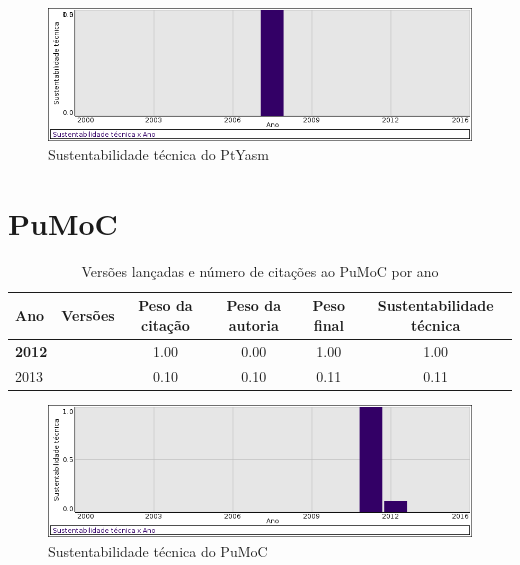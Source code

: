 \begin{figure}[h]
  \center
  \includegraphics[scale=0.50]{imagens/softwares-charts/ptyasm.png}
  \caption{Sustentabilidade técnica do PtYasm}
\end{figure}


\section{PuMoC}


\begin{table}[H]
\caption{Versões lançadas e número de citações ao PuMoC por ano}
\centering
\begin{tabular}{| l | c | c | c | c | c |}
  \hline
  Ano & Versões & Peso da citação & Peso da autoria & Peso final & Sustentabilidade técnica \\
  \hline
            {\bf 2012}
          &
          
          &
          1.00
          &
          0.00
          &
          1.00
          &
            {\color{blue} 1.00}
          \\
\hline
            2013
          &
          
          &
          0.10
          &
          0.10
          &
          0.11
          &
            {\color{red} 0.11}
          \\
\hline
\end{tabular}
\end{table}

\begin{figure}[h]
  \center
  \includegraphics[scale=0.50]{imagens/softwares-charts/pumoc.png}
  \caption{Sustentabilidade técnica do PuMoC}
\end{figure}



